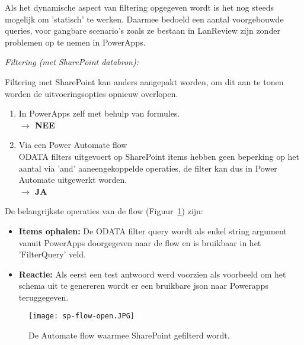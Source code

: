 Als het dynamische aspect van filtering opgegeven wordt is het nog steeds mogelijk om 'statisch' te werken. Daarmee bedoeld een aantal voorgebouwde queries, voor gangbare scenario's zoals ze bestaan in LanReview zijn zonder problemen op te nemen in PowerApps.

\textit{Filtering (met SharePoint databron):}

Filtering met SharePoint kan anders aangepakt worden, om dit aan te tonen worden de uitvoeringsopties opnieuw overlopen.
\begin{enumerate}
    \item In PowerApps zelf met behulp van formules.\\
    \textbf{$\rightarrow$ NEE}
    \item Via een Power Automate flow\\
    ODATA filters uitgevoert op SharePoint items hebben geen beperking op het aantal via 'and' aaneengekoppelde operaties, de filter kan dus in Power Automate uitgewerkt worden.\\
    \textbf{$\rightarrow$ JA}
\end{enumerate}

De belangrijkste operaties van de flow (Figuur~\ref{fig:sp-flow-open}) zijn:
\begin{itemize}
    \item \textbf{Items ophalen:} De ODATA filter query wordt als enkel string argument vanuit PowerApps doorgegeven naar de flow en is bruikbaar in het 'FilterQuery' veld.
    \item \textbf{Reactie:} Als eerst een test antwoord werd voorzien als voorbeeld om het schema uit te genereren wordt er een bruikbare json naar Powerapps teruggegeven.
\end{itemize}

\begin{figure}[h!]
    \centering
    \texttt{[image: sp-flow-open.JPG]}
    \caption{De Automate flow waarmee SharePoint gefilterd wordt.}
    \label{fig:sp-flow-open}
\end{figure}

